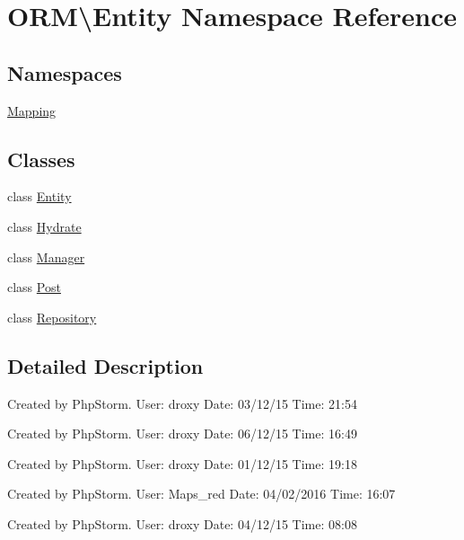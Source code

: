 \hypertarget{namespaceORM_1_1Entity}{}\section{O\+RM\textbackslash{}Entity Namespace Reference}
\label{namespaceORM_1_1Entity}
\subsection*{Namespaces}
\begin{DoxyCompactItemize}
\item 
 \hyperlink{namespaceORM_1_1Entity_1_1Mapping}{Mapping}
\end{DoxyCompactItemize}
\subsection*{Classes}
\begin{DoxyCompactItemize}
\item 
class \hyperlink{classORM_1_1Entity_1_1Entity}{Entity}
\item 
class \hyperlink{classORM_1_1Entity_1_1Hydrate}{Hydrate}
\item 
class \hyperlink{classORM_1_1Entity_1_1Manager}{Manager}
\item 
class \hyperlink{classORM_1_1Entity_1_1Post}{Post}
\item 
class \hyperlink{classORM_1_1Entity_1_1Repository}{Repository}
\end{DoxyCompactItemize}


\subsection{Detailed Description}
Created by Php\+Storm. User\+: droxy Date\+: 03/12/15 Time\+: 21\+:54

Created by Php\+Storm. User\+: droxy Date\+: 06/12/15 Time\+: 16\+:49

Created by Php\+Storm. User\+: droxy Date\+: 01/12/15 Time\+: 19\+:18

Created by Php\+Storm. User\+: Maps\+\_\+red Date\+: 04/02/2016 Time\+: 16\+:07

Created by Php\+Storm. User\+: droxy Date\+: 04/12/15 Time\+: 08\+:08 